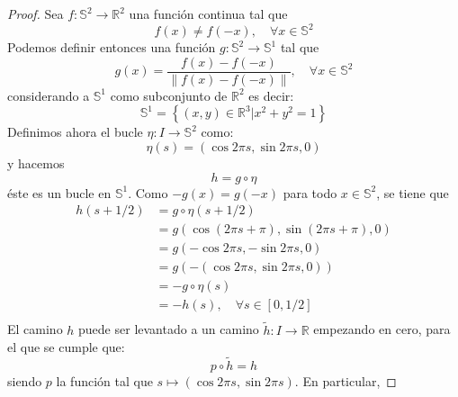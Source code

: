 \documentclass[12pt]{report}
\theoremstyle{largebreak}
\newcommand\cf[3]{\ensuremath{#1:#2\rightarrow#3}}
\begin{document}
    \begin{proof}
        Sea $\cf{f}{\mathbb{S}^2}{\mathbb{R}^2}$ una función continua tal que
        \begin{equation*}
            f(x)\neq f(-x),\quad\forall x\in\mathbb{S}^2
        \end{equation*}
        Podemos definir entonces una función $\cf{g}{\mathbb{S}^2}{\mathbb{S}^1}$ tal que
        \begin{equation*}
            g(x)=\frac{f(x)-f(-x)}{\|f(x)-f(-x) \|},\quad\forall x\in\mathbb{S}^2
        \end{equation*}
        considerando a $\mathbb{S}^1$ como subconjunto de $\mathbb{R}^2$ es decir:
        \begin{equation*}
            \mathbb{S}^1=\left\{(x,y)\in\mathbb{R}^3\Big|x^2+y^2=1 \right\}
        \end{equation*}
        Definimos ahora el bucle $\cf{\eta}{I}{\mathbb{S}^2}$ como:
        \begin{equation*}
            \eta(s)=(\cos 2\pi s,\sin 2\pi s,0)
        \end{equation*}
        y hacemos
        \begin{equation*}
            h=g\circ \eta
        \end{equation*}
        éste es un bucle en $\mathbb{S}^1$. Como $-g(x)=g(-x)$ para todo $x\in\mathbb{S}^2$, se tiene que
        \begin{equation*}
            \begin{split}
                h(s+1/2)&=g\circ\eta(s+1/2)\\
                &=g(\cos (2\pi s+\pi),\sin (2\pi s+\pi),0)\\
                &=g(-\cos 2\pi s,-\sin 2\pi s,0)\\
                &=g(-(\cos 2\pi s,\sin 2\pi s,0))\\
                &=-g\circ\eta(s)\\
                &=-h(s),\quad\forall s\in[0,1/2]\\
            \end{split}
        \end{equation*}
        El camino $h$ puede ser levantado a un camino $\cf{\widetilde{h}}{I}{\mathbb{R}}$ empezando en cero, para el que se cumple que:
        \begin{equation*}
            p\circ \widetilde{h}=h
        \end{equation*}
        siendo $p$ la función tal que $s\mapsto(\cos 2\pi s,\sin 2\pi s)$. En particular,

\end{proof}
\end{document}
